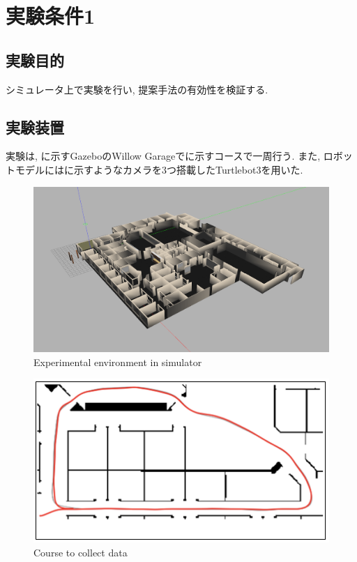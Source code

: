 
\section{実験条件1}
\subsection{実験目的}
シミュレータ上で実験を行い, 提案手法の有効性を検証する.

\subsection{実験装置}
実験は, に示すGazebo\cite{gazebo}のWillow Garage\cite{willow}でに示すコースで一周行う. また, ロボットモデルにはに示すようなカメラを3つ搭載したTurtlebot3\cite{turtlebot3}を用いた. 

\begin{figure}[h]
  \centering
  \includegraphics[keepaspectratio, scale=0.15]{images/gazebo.png}
  \caption{Experimental environment in simulator}
  \label{Fig:gazebo}
  \end{figure}

\begin{figure}[h]
  \centering
  \includegraphics[keepaspectratio, scale=0.5]{images/willow-garage.png}
  \caption{Course to collect data}
  \label{Fig:willow-garage}
  \end{figure}

